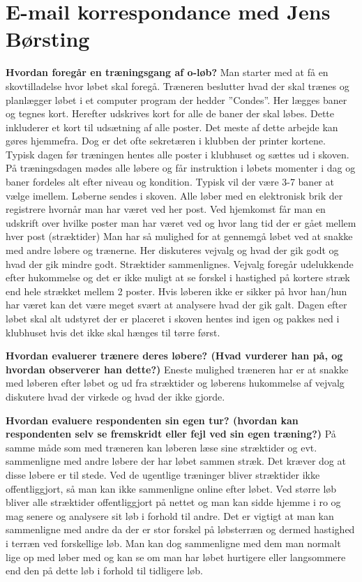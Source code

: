 \chapter{E-mail korrespondance med Jens Børsting}
\textbf{Hvordan foregår en træningsgang af o-løb?}\newline
Man starter med at få en skovtilladelse hvor løbet skal foregå.
Træneren beslutter hvad der skal trænes og planlægger løbet i et computer program der hedder ”Condes”. Her lægges baner og tegnes kort. Herefter udskrives kort for alle de baner der skal løbes. Dette inkluderer et kort til udsætning af alle poster. Det meste af dette arbejde kan gøres hjemmefra. Dog er det ofte sekretæren i klubben der printer kortene.
Typisk dagen før træningen hentes alle poster i klubhuset og sættes ud i skoven.
På træningsdagen mødes alle løbere og får instruktion i løbets momenter i dag og baner fordeles alt efter niveau og kondition. Typisk vil der være 3-7 baner at vælge imellem.
Løberne sendes i skoven. Alle løber med en elektronisk brik der registrere hvornår man har været ved her post.
Ved hjemkomst får man en udskrift over hvilke poster man har været ved og hvor lang tid der er gået mellem hver post (stræktider)
Man har så mulighed for at gennemgå løbet ved at snakke med andre løbere og trænerne. Her diskuteres vejvalg og hvad der gik godt og hvad der gik mindre godt. Stræktider sammenlignes. Vejvalg foregår udelukkende efter hukommelse og det er ikke muligt at se forskel i hastighed på kortere stræk end hele strækket mellem 2 poster.
Hvis løberen ikke er sikker på hvor han/hun har været kan det være meget svært at analysere hvad der gik galt.
Dagen efter løbet skal alt udstyret der er placeret i skoven hentes ind igen og pakkes ned i klubhuset hvis det ikke skal hænges til tørre først.

\textbf{Hvordan evaluerer trænere deres løbere? (Hvad vurderer han på, og hvordan observerer han dette?)}\newline
Eneste mulighed træneren har er at snakke med løberen efter løbet og ud fra stræktider og løberens hukommelse af vejvalg diskutere hvad der virkede og hvad der ikke gjorde.

\textbf{Hvordan evaluere respondenten sin egen tur? (hvordan kan respondenten selv se fremskridt eller fejl ved sin egen træning?)}\newline
På samme måde som med træneren kan løberen læse sine stræktider og evt. sammenligne med andre løbere der har løbet sammen stræk. Det kræver dog at disse løbere er til stede. Ved de ugentlige træninger bliver stræktider ikke offentliggjort, så man kan ikke sammenligne online efter løbet. Ved større løb bliver alle stræktider offentliggjort på nettet og man kan sidde hjemme i ro og mag senere og analysere sit løb i forhold til andre. Det er vigtigt at man kan sammenligne med andre da der er stor forskel på løbsterræn og dermed hastighed i terræn ved forskellige løb. Man kan dog sammenligne med dem man normalt lige op med løber med og kan se om man har løbet hurtigere eller langsommere end den på dette løb i forhold til tidligere løb.

